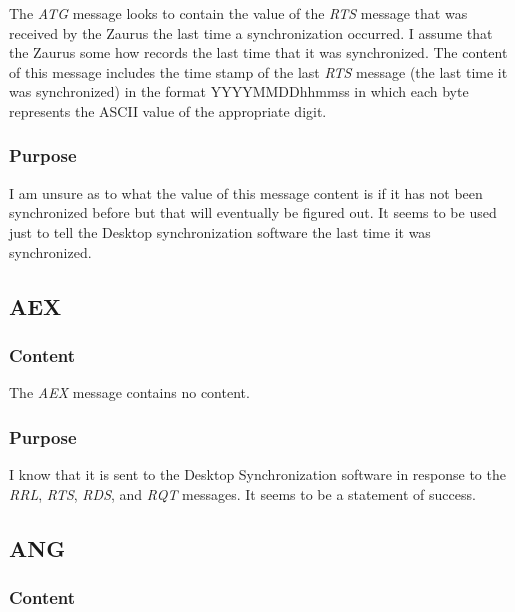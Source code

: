             The \emph{ATG} message looks to contain the value of the
            \emph{RTS} message that was received by the Zaurus the last time a
            synchronization occurred. I assume that the Zaurus some how records
            the last time that it was synchronized. The content of this message
            includes the time stamp of the last \emph{RTS} message (the last
            time it was synchronized) in the format YYYYMMDDhhmmss in which
            each byte represents the ASCII value of the appropriate digit.

            \subsubsection{Purpose}

            I am unsure as to what the value of this message content is if it
            has not been synchronized before but that will eventually be
            figured out. It seems to be used just to tell the Desktop
            synchronization software the last time it was synchronized.

        \subsection{AEX}

            \subsubsection{Content}

            The \emph{AEX} message contains no content.

            \subsubsection{Purpose}

            I know that it is sent to the Desktop Synchronization software in
            response to the \emph{RRL}, \emph{RTS}, \emph{RDS}, and \emph{RQT}
            messages. It seems to be a statement of success.

        \subsection{ANG}

            \subsubsection{Content}


